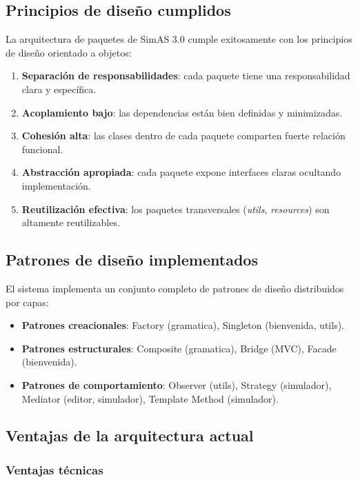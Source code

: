 \subsection{Principios de diseño cumplidos}

La arquitectura de paquetes de SimAS 3.0 cumple exitosamente con los principios de diseño orientado a objetos:

\begin{enumerate}
    \item \textbf{Separación de responsabilidades}: cada paquete tiene una responsabilidad clara y específica.
    \item \textbf{Acoplamiento bajo}: las dependencias están bien definidas y minimizadas.
    \item \textbf{Cohesión alta}: las clases dentro de cada paquete comparten fuerte relación funcional.
    \item \textbf{Abstracción apropiada}: cada paquete expone interfaces claras ocultando implementación.
    \item \textbf{Reutilización efectiva}: los paquetes transversales (\textit{utils}, \textit{resources}) son altamente reutilizables.
\end{enumerate}

\subsection{Patrones de diseño implementados}

El sistema implementa un conjunto completo de patrones de diseño distribuidos por capas:

\begin{itemize}
    \item \textbf{Patrones creacionales}: Factory (gramatica), Singleton (bienvenida, utils).
    \item \textbf{Patrones estructurales}: Composite (gramatica), Bridge (MVC), Facade (bienvenida).
    \item \textbf{Patrones de comportamiento}: Observer (utils), Strategy (simulador), Mediator (editor, simulador), Template Method (simulador).
\end{itemize}

\subsection{Ventajas de la arquitectura actual}

\subsubsection{Ventajas técnicas}

